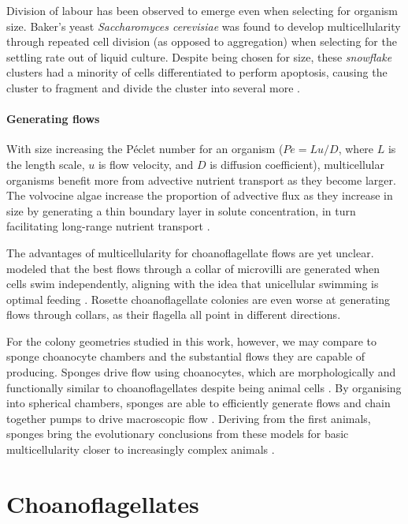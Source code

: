 Division of labour has been observed to emerge even when selecting for organism size.
Baker's yeast \textit{Saccharomyces cerevisiae} was found to develop multicellularity through repeated cell division (as opposed to aggregation) when selecting for the settling rate out of liquid culture.
Despite being chosen for size, these \textit{snowflake} clusters had a minority of cells differentiated to perform apoptosis, causing the cluster to fragment and divide the cluster into several more \citep{ratcliff2012}. 

\paragraph*{Generating flows} With size increasing the P\'eclet number for an organism ($Pe = Lu/D$, where $L$ is the length scale, $u$ is flow velocity, and $D$ is diffusion coefficient), multicellular organisms benefit more from advective nutrient transport as they become larger. 
The volvocine algae increase the proportion of advective flux as they increase in size by generating a thin boundary layer in solute concentration, in turn facilitating long-range nutrient transport \citep{short2006}.

The advantages of multicellularity for choanoflagellate flows are yet unclear. 
\citet{kirkegaard2016} modeled that the best flows through a collar of microvilli are generated when cells swim independently, aligning with the idea that unicellular swimming is optimal feeding \citep{michelin2011}. 
Rosette choanoflagellate colonies are even worse at generating flows through collars, as their flagella all point in different directions. 

For the colony geometries studied in this work, however, we may compare to sponge choanocyte chambers and the substantial flows they are capable of producing. 
Sponges drive flow using choanocytes, which are morphologically and functionally similar to choanoflagellates despite being animal cells \citep{larsen1994,carr2008}.
By organising into spherical chambers, sponges are able to efficiently generate flows and chain together pumps to drive macroscopic flow \citep{asadzadeh2019}.
Deriving from the first animals, sponges bring the evolutionary conclusions from these models for basic multicellularity closer to increasingly complex animals \citep{nielsen2008}.

\section{Choanoflagellates} \label{sec:choano} %


